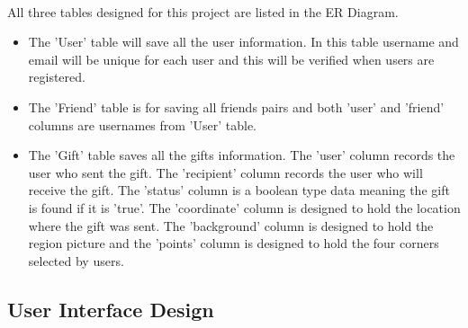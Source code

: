 \paragraph{}
All three tables designed for this project are listed in the ER Diagram.
\begin{itemize}
\item The 'User' table will save all the user information. In this table username and email will be unique for each user and this will be verified when users are registered.
\item The 'Friend' table is for saving all friends pairs and both 'user' and 'friend' columns are usernames from 'User' table.
\item The 'Gift' table saves all the gifts information. The 'user' column records the user who sent the gift. The 'recipient' column records the user who will receive the gift. The 'status' column is a boolean type data meaning the gift is found if it is 'true'. The 'coordinate' column is designed to hold the location where the gift was sent. The 'background' column is designed to hold the region picture and the 'points' column is designed to hold the four corners selected by users.
\end{itemize}

\subsection{User Interface Design}
